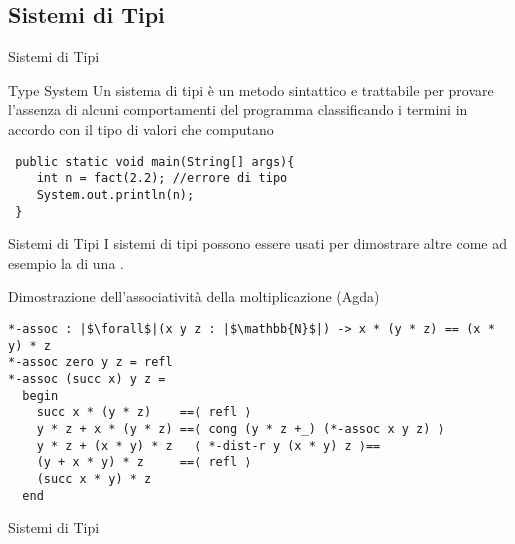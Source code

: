 \subsection{Sistemi di Tipi} %
\begin{frame}[containsverbatim]{Sistemi di Tipi}
\begin{block}{Type System}
    Un sistema di tipi \`e un metodo sintattico e trattabile per provare l'assenza di alcuni comportamenti del programma classificando i termini in accordo con il tipo
    di valori che computano
\end{block}
\begin{example}
\begin{verbatim}
 public static void main(String[] args){
	int n = fact(2.2); //errore di tipo
	System.out.println(n);
 }
\end{verbatim}
\end{example}
\end{frame}

\begin{frame}[containsverbatim]{Sistemi di Tipi}
I sistemi di tipi possono essere usati per dimostrare altre  come ad esempio la  di una .
\begin{block}{Dimostrazione dell'associativit\`a della moltiplicazione (Agda)}
\begin{verbatim}
*-assoc : |$\forall$|(x y z : |$\mathbb{N}$|) -> x * (y * z) == (x * y) * z
*-assoc zero y z = refl
*-assoc (succ x) y z =
  begin
	succ x * (y * z)    ==⟨ refl ⟩
	y * z + x * (y * z) ==⟨ cong (y * z +_) (*-assoc x y z) ⟩
	y * z + (x * y) * z   ⟨ *-dist-r y (x * y) z ⟩==
	(y + x * y) * z     ==⟨ refl ⟩
	(succ x * y) * z
  end
\end{verbatim}
\end{block}
\end{frame}
\begin{frame}[containsverbatim]{Sistemi di Tipi}
\end{frame}